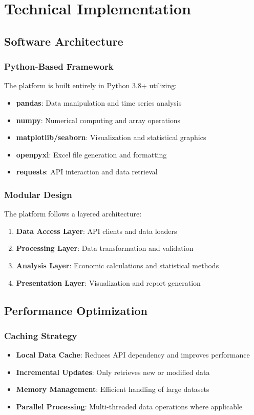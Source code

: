 \documentclass[11pt,a4paper]{article}
\begin{document}
\section{Technical Implementation}

\subsection{Software Architecture}

\subsubsection{Python-Based Framework}
The platform is built entirely in Python 3.8+ utilizing:
\begin{itemize}
    \item \textbf{pandas}: Data manipulation and time series analysis
    \item \textbf{numpy}: Numerical computing and array operations
    \item \textbf{matplotlib/seaborn}: Visualization and statistical graphics
    \item \textbf{openpyxl}: Excel file generation and formatting
    \item \textbf{requests}: API interaction and data retrieval
\end{itemize}

\subsubsection{Modular Design}
The platform follows a layered architecture:
\begin{enumerate}
    \item \textbf{Data Access Layer}: API clients and data loaders
    \item \textbf{Processing Layer}: Data transformation and validation
    \item \textbf{Analysis Layer}: Economic calculations and statistical methods
    \item \textbf{Presentation Layer}: Visualization and report generation
\end{enumerate}

\subsection{Performance Optimization}

\subsubsection{Caching Strategy}
\begin{itemize}
    \item \textbf{Local Data Cache}: Reduces API dependency and improves performance
    \item \textbf{Incremental Updates}: Only retrieves new or modified data
    \item \textbf{Memory Management}: Efficient handling of large datasets
    \item \textbf{Parallel Processing}: Multi-threaded data operations where applicable
\end{itemize}
\end{document}
